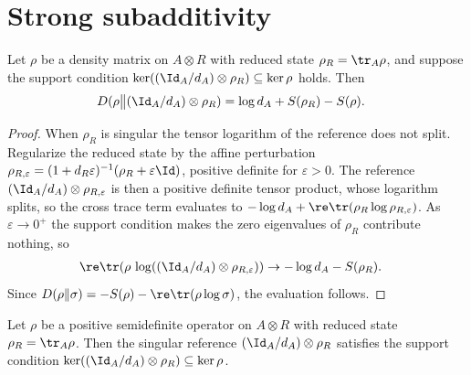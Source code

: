 \section{Strong subadditivity}

\begin{lemma}
    \label{lem:rel_entropy_eval_support}
    \leanok
    Let $\rho$ be a density matrix on $A \otimes R$ with reduced state
    $\rho_R = \tr_A \rho$, and suppose the support condition
    $\ker((\Id_A / d_A) \otimes \rho_R) \subseteq \ker\rho$ holds.
    Then
    \begin{align}
        D(\rho \big\| (\Id_A / d_A) \otimes \rho_R)
        &= \log d_A + S(\rho_R) - S(\rho).
        \label{eq:entropy_mixed_reference}
    \end{align}
\end{lemma}

\begin{proof}\leanok
    When $\rho_R$ is singular the tensor logarithm of the reference does not split.
    Regularize the reduced state by the affine perturbation
    $\rho_{R,\varepsilon}
    = (1 + d_R\varepsilon)^{-1}(\rho_R + \varepsilon\Id)$,
    positive definite for $\varepsilon > 0$. The reference
    $(\Id_A / d_A) \otimes \rho_{R,\varepsilon}$ is then a positive definite
    tensor product, whose logarithm splits, so the cross trace term evaluates to
    $-\log d_A + \re\tr(\rho_R\log\rho_{R,\varepsilon})$.
    As $\varepsilon \to 0^+$ the support condition makes the zero eigenvalues of
    $\rho_R$ contribute nothing, so
    \begin{align}
        \re\tr(\rho\,\log((\Id_A / d_A) \otimes \rho_{R,\varepsilon}))
        &\to -\log d_A - S(\rho_R).
        \notag
    \end{align}
    Since $D(\rho \| \sigma)
    = -S(\rho) - \re\tr(\rho\log\sigma)$, the
    evaluation follows.
\end{proof}

\begin{lemma}
    \label{lem:kron_marginal_support}
    \leanok
    Let $\rho$ be a positive semidefinite operator on $A \otimes R$ with reduced
    state $\rho_R = \tr_A \rho$. Then the singular reference
    $(\Id_A / d_A) \otimes \rho_R$ satisfies the support condition
    $\ker((\Id_A / d_A) \otimes \rho_R) \subseteq \ker\rho$.
\end{lemma}


